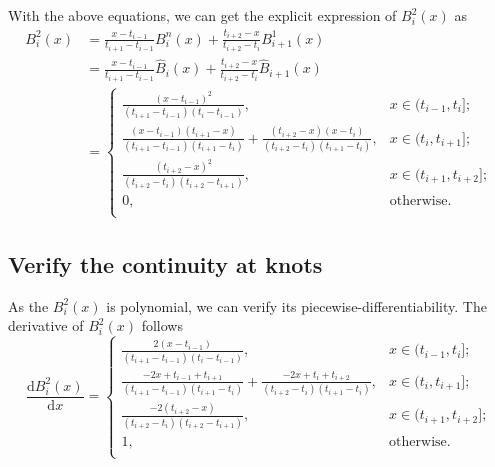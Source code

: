 \documentclass[a4paper]{article}
\begin{document}
With the above equations, we can get the explicit expression of $B_i^2(x)$ as
\begin{equation}
  \begin{aligned}
    B_i^2(x) &= \frac{x - t_{i - 1}}{t_{i + 1} - t_{i - 1}}B_i^n(x) + \frac{t_{i + 2} - x}{t_{i + 2} - t_i}B_{i + 1}^1(x) \\
    &= \frac{x - t_{i - 1}}{t_{i + 1} - t_{i - 1}} \hat{B}_i(x) + \frac{t_{i + 2} - x}{t_{i + 2} - t_i} \hat{B}_{i + 1}(x) \\
    &= \begin{cases}
      \frac{(x - t_{i - 1})^2}{(t_{i + 1} - t_{i - 1})(t_i - t_{i - 1})},& x \in (t_{i - 1}, t_i]; \\
      \frac{(x - t_{i - 1})(t_{i + 1} - x)}{(t_{i + 1} - t_{i - 1})(t_{i + 1} - t_i)} + \frac{(t_{i + 2} - x)(x - t_i)}{(t_{i + 2} - t_i)(t_{i + 1} - t_i)},& x \in (t_i, t_{i + 1}]; \\
      \frac{(t_{i + 2} - x)^2}{(t_{i + 2} - t_i)(t_{i + 2} - t_{i + 1})},& x \in (t_{i + 1}, t_{i + 2}]; \\
      0,& \text{otherwise}. \\
    \end{cases}
  \end{aligned}
  \label{eq:5_B_spline_explicit_expression}
\end{equation}

\subsection{Verify the continuity at knots}

As the $B_i^2(x)$ is polynomial, we can verify its piecewise-differentiability. The derivative of $B_i^2(x)$ follows
\begin{equation}
  \frac{\mathrm{d}B_i^2(x)}{\mathrm{d}x} = \begin{cases}
    \frac{2(x - t_{i - 1})}{(t_{i + 1} - t_{i - 1})(t_i - t_{i - 1})},& x \in (t_{i - 1}, t_i]; \\
    \frac{-2x + t_{i - 1} + t_{i + 1}}{(t_{i + 1} - t_{i - 1})(t_{i + 1} - t_i)} + \frac{-2x + t_i + t_{i + 2}}{(t_{i + 2} - t_i)(t_{i + 1} - t_i)},& x \in (t_i, t_{i + 1}]; \\
    \frac{-2(t_{i + 2} - x)}{(t_{i + 2} - t_i)(t_{i + 2} - t_{i + 1})},& x \in (t_{i + 1}, t_{i + 2}]; \\
    1,& \text{otherwise}. \\
  \end{cases}
  \label{eq:5_B_spline_derivative}
\end{equation}
\end{document}
